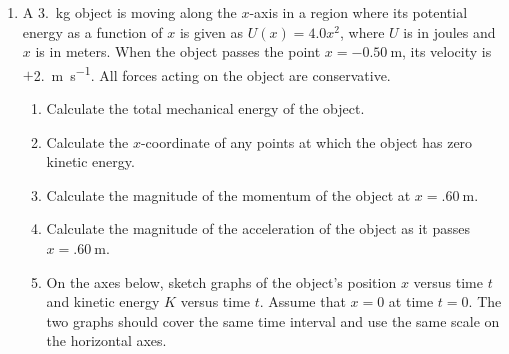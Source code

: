 \documentclass{../../../oss-apphys}
\begin{document}
\begin{enumerate}[leftmargin=15pt]
\item A \SI{3.}{\kilo\gram} object is moving along the $x$-axis in a region
  where its potential energy as a function of $x$ is given as $U(x)=4.0x^2$,
  where $U$ is in joules and $x$ is in meters. When the object passes the point
  $x=\SI{-0.50}{\metre}$, its velocity is $+$\SI{2.}{\metre\per\second}. All
  forces acting on the object are conservative.
  \begin{enumerate}[leftmargin=18pt]

  \item Calculate the total mechanical energy of the object.
  \item Calculate the $x$-coordinate of any points at which the object has zero
    kinetic energy.
  \item Calculate the magnitude of the momentum of the object at
    $x=\SI{.60}{\metre}$.
  \item Calculate the magnitude of the acceleration of the object as it passes
    $x=\SI{.60}{\metre}$.
    \newpage
  \item On the axes below, sketch graphs of the object's position $x$ versus
    time $t$ and kinetic energy $K$ versus time $t$. Assume that $x=0$ at time
    $t=0$. The two graphs should cover the same time interval and use the same
    scale on the horizontal axes.
    \begin{center}
      \vspace{.2in}
    \end{center}
  \end{enumerate}
  

\end{enumerate}
\end{document}
